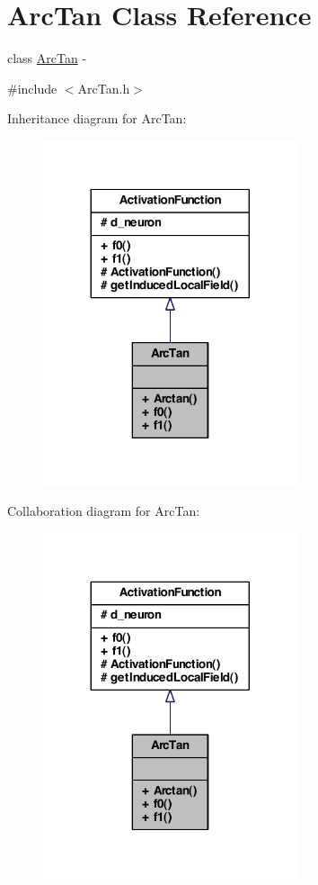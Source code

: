 \hypertarget{class_arc_tan}{
\section{ArcTan Class Reference}
\label{class_arc_tan}
}


class \hyperlink{class_arc_tan}{ArcTan} -\/  




{\ttfamily \#include $<$ArcTan.h$>$}



Inheritance diagram for ArcTan:\nopagebreak
\begin{figure}[H]
\begin{center}
\leavevmode
\includegraphics[width=212pt]{class_arc_tan__inherit__graph}
\end{center}
\end{figure}


Collaboration diagram for ArcTan:\nopagebreak
\begin{figure}[H]
\begin{center}
\leavevmode
\includegraphics[width=212pt]{class_arc_tan__coll__graph}
\end{center}
\end{figure}
